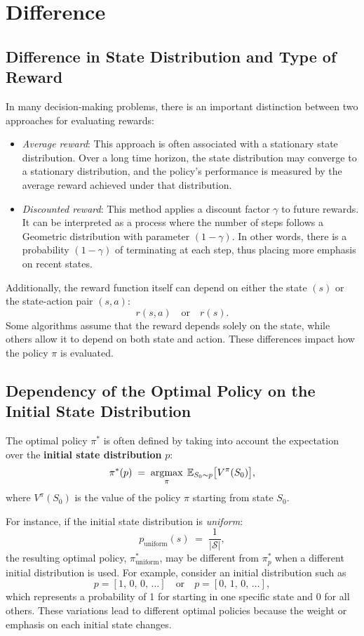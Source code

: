 \section{Difference}

\subsection{Difference in State Distribution and Type of Reward}

In many decision-making problems, there is an important distinction between two approaches for evaluating rewards:

\begin{itemize}
    \item \emph{Average reward}: This approach is often associated with a stationary state distribution. Over a long time horizon, the state distribution may converge to a stationary distribution, and the policy's performance is measured by the average reward achieved under that distribution.
    \item \emph{Discounted reward}: This method applies a discount factor \(\gamma\) to future rewards. It can be interpreted as a process where the number of steps follows a Geometric distribution with parameter \((1-\gamma)\). In other words, there is a probability \((1-\gamma)\) of terminating at each step, thus placing more emphasis on recent states.
\end{itemize}

Additionally, the reward function itself can depend on either the state \((s)\) or the state-action pair \((s,a)\):
\[
  r(s,a) 
  \quad \text{or} \quad 
  r(s).
\]
Some algorithms assume that the reward depends solely on the state, while others allow it to depend on both state and action. These differences impact how the policy \(\pi\) is evaluated.

\subsection{Dependency of the Optimal Policy on the Initial State Distribution}

The optimal policy \(\pi^*\) is often defined by taking into account the expectation over the \textbf{initial state distribution} \(p\):
\[
  \pi^*(p) 
  \;=\; 
  \operatorname*{\arg\!\max}_{\pi} 
  \; \mathbb{E}_{S_0 \sim p} \bigl[ V^\pi(S_0) \bigr],
\]
where \(V^\pi(S_0)\) is the value of the policy \(\pi\) starting from state \(S_0\).

For instance, if the initial state distribution is \emph{uniform}:
\[
  p_{\text{uniform}}(s) 
  \;=\; 
  \frac{1}{|\mathcal{S}|},
\]
the resulting optimal policy, \(\pi^*_{\text{uniform}}\), may be different from \(\pi^*_p\) when a different initial distribution is used. For example, consider an initial distribution such as
\[
  p = [1,\, 0,\, 0,\, \dots] 
  \quad \text{or} \quad 
  p = [0,\, 1,\, 0,\, \dots],
\]
which represents a probability of 1 for starting in one specific state and 0 for all others. These variations lead to different optimal policies because the weight or emphasis on each initial state changes.

